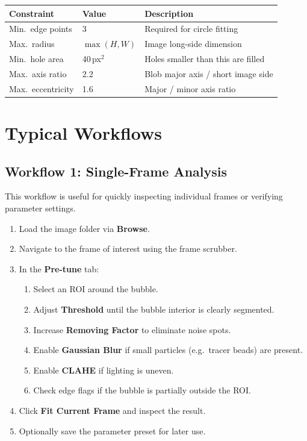 \documentclass[11pt, letterpaper]{article}
\begin{document}
\begin{center}
\begin{tabular}{lll}
    \toprule
    \textbf{Constraint} & \textbf{Value} & \textbf{Description} \\
    \midrule
    Min.\ edge points & 3 & Required for circle fitting \\
    Max.\ radius & $\max(H, W)$ & Image long-side dimension \\
    Min.\ hole area & 40\,px$^2$ & Holes smaller than this are filled \\
    Max.\ axis ratio & 2.2 & Blob major axis / short image side \\
    Max.\ eccentricity & 1.6 & Major / minor axis ratio \\
    \bottomrule
\end{tabular}
\end{center}


\section{Typical Workflows}

\subsection{Workflow 1: Single-Frame Analysis}

This workflow is useful for quickly inspecting individual frames or verifying
parameter settings.

\begin{enumerate}
    \item Load the image folder via \textbf{Browse}.
    \item Navigate to the frame of interest using the frame scrubber.
    \item In the \textbf{Pre-tune} tab:
    \begin{enumerate}[label=\alph*.]
        \item Select an ROI around the bubble.
        \item Adjust \textbf{Threshold} until the bubble interior is clearly
              segmented.
        \item Increase \textbf{Removing Factor} to eliminate noise spots.
        \item Enable \textbf{Gaussian Blur} if small particles (e.g.\ tracer
              beads) are present.
        \item Enable \textbf{CLAHE} if lighting is uneven.
        \item Check edge flags if the bubble is partially outside the ROI.
    \end{enumerate}
    \item Click \textbf{Fit Current Frame} and inspect the result.
    \item Optionally save the parameter preset for later use.
\end{enumerate}
\end{document}

